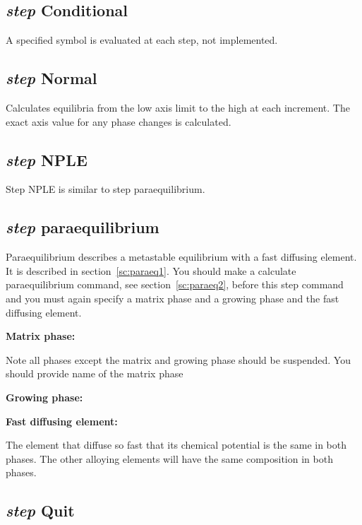 \documentclass[11pt]{article}
\begin{document}
\hypertarget{Step conditional}{}
\subsection{{\em step} Conditional}

A specified symbol is evaluated at each step, not implemented.

\hypertarget{Step normal}{}
\subsection{{\em step} Normal}

Calculates equilibria from the low axis limit to the high at each
increment.  The exact axis value for any phase changes is calculated.

\hypertarget{Step NPLE}{}
\subsection{{\em step} NPLE}

Step NPLE is similar to step paraequilibrium.

\hypertarget{Step paraequilibrium}{}
\subsection{{\em step} paraequilibrium}\label{sc:paraeq3}

Paraequilibrium describes a metastable equilibrium with a fast
diffusing element.  It is described in section~\ref{sc:paraeq1}.  You
should make a calculate paraequilibrium command, see
section~\ref{sc:paraeq2}, before this step command and you must again
specify a matrix phase and a growing phase and the fast diffusing
element.

{\bf Matrix phase:}
              
Note all phases except the matrix and growing phase should be
suspended.  You should provide name of the matrix phase

{\bf Growing phase:}

{\bf Fast diffusing element:}

The element that diffuse so fast that its chemical potential is the
same in both phases.  The other alloying elements will have the same
composition in both phases.


\hypertarget{Step Quit}{}
\subsection{{\em step} Quit}
\end{document}
